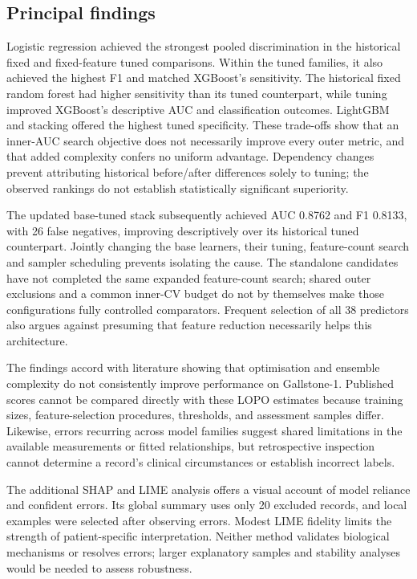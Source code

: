 \subsection{Principal findings}
Logistic regression achieved the strongest pooled discrimination in the historical fixed and fixed-feature tuned comparisons. Within the tuned families, it also achieved the highest F1 and matched XGBoost's sensitivity. The historical fixed random forest had higher sensitivity than its tuned counterpart, while tuning improved XGBoost's descriptive AUC and classification outcomes. LightGBM and stacking offered the highest tuned specificity. These trade-offs show that an inner-AUC search objective does not necessarily improve every outer metric, and that added complexity confers no uniform advantage. Dependency changes prevent attributing historical before/after differences solely to tuning; the observed rankings do not establish statistically significant superiority.

The updated base-tuned stack subsequently achieved AUC 0.8762 and F1 0.8133, with 26 false negatives, improving descriptively over its historical tuned counterpart. Jointly changing the base learners, their tuning, feature-count search and sampler scheduling prevents isolating the cause. The standalone candidates have not completed the same expanded feature-count search; shared outer exclusions and a common inner-CV budget do not by themselves make those configurations fully controlled comparators. Frequent selection of all 38 predictors also argues against presuming that feature reduction necessarily helps this architecture.

The findings accord with literature showing that optimisation and ensemble complexity do not consistently improve performance on Gallstone-1. Published scores cannot be compared directly with these LOPO estimates because training sizes, feature-selection procedures, thresholds, and assessment samples differ. Likewise, errors recurring across model families suggest shared limitations in the available measurements or fitted relationships, but retrospective inspection cannot determine a record's clinical circumstances or establish incorrect labels.

The additional SHAP and LIME analysis offers a visual account of model reliance and confident errors. Its global summary uses only 20 excluded records, and local examples were selected after observing errors. Modest LIME fidelity limits the strength of patient-specific interpretation. Neither method validates biological mechanisms or resolves errors; larger explanatory samples and stability analyses would be needed to assess robustness.

